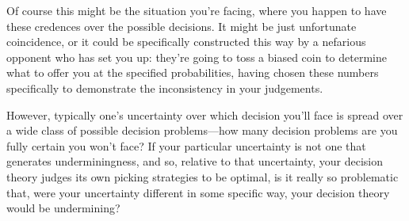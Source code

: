 \documentclass[a4paper]{article}
\newcommand{\todoold}[2][]{\todo[backgroundcolor=white,bordercolor=orange!10,linecolor=gray!10, #1,caption={},textcolor=gray]{Pre-rev: #2}}
\renewcommand{\color}[1]{}
\newenvironment{colored}[1]{\leavevmode\color{#1}}{}
\newenvironment{CCM rewritten}
{\begingroup\color{blue}} %
{\endgroup}              %
\begin{document}
	Of course this might be the situation you're facing, where you happen to have these credences over the possible decisions. It might be just unfortunate coincidence, or it could be specifically constructed this way by a nefarious opponent who has set you up: they're going to toss a biased coin to determine what to offer you at the specified probabilities, having chosen these numbers specifically to demonstrate the inconsistency in your judgements. 
	
	However, typically one's uncertainty over which decision you'll face is spread over a wide class of possible decision problems---how many decision problems are you fully certain you won't face? If your particular uncertainty is not one that generates underminingness, and so, relative to that uncertainty, your decision theory judges its own picking strategies to be optimal, is it really so problematic that, were your uncertainty different in some specific way, your decision theory would be undermining?
	
	


%
%
\end{document}
